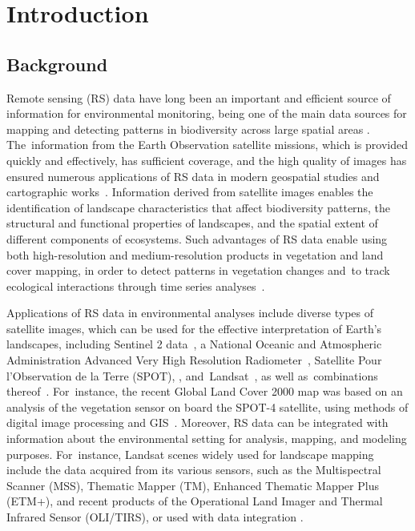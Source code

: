 \documentclass[coasts,article,accept,pdftex,oneauthor]{Definitions/mdpi}
\begin{document}
\section{Introduction}

\subsection{Background}
Remote sensing (RS) data {have} long been an important and efficient source of information {for} environmental monitoring, being one of the main data sources for mapping and detecting patterns {in} biodiversity across large spatial areas \cite{FAGAN2024432}. The~information from the Earth Observation satellite missions, which is provided quickly and {effectively}, %
has sufficient coverage{, }and {the} high quality of images {has} ensured numerous applications of RS data in modern geospatial studies and cartographic works~\cite{LOEB2023}. {Information derived from {satellite} images enables {the identification of} landscape characteristics that affect biodiversity {patterns}, the structural and functional properties of landscapes{, and the} spatial extent of different components of ecosystems. Such advantages of {RS} data enable {using} }both high-resolution and medium-resolution {products} in vegetation and land cover mapping{,} in order to detect patterns {in} vegetation changes{ }and~to track ecological interactions through time series analyses~\cite{6352393,info14040249,Lemenkova202324}. 

{Applications of RS data in environmental analyses include diverse} types of satellite images{,} {{which} can be used }for the effective interpretation of Earth's landscapes{,} {including} {Sentinel} 2 {data}~\cite{ZHAO2024169152,Lemenkova202021,CHOUDHARY20222443}, a National Oceanic and Atmospheric Administration Advanced Very High Resolution Radiometer~\cite{JI2017215,ZHAN2022112836}, Satellite Pour l'Observation de la Terre (SPOT{)}, \cite{FENSHOLT20091886}, {and}~Landsat~\cite{CHEN2023e19654,Lemenkova202323,LEMESIOS2024101153,SENAY2022113011,Lemenkova202321}, {as well as}~combinations thereof~\cite{XIE2023,RADELOFF2024113918}. For~instance, {the} recent Global Land Cover 2000 map was based on an analysis of the {vegetation} sensor on board the SPOT-4 satellite, using methods of digital image processing and GIS~\cite{GIRI2005123,WANG2023311}. {Moreover, RS data can be integrated with information about the environmental setting for analysis, mapping{,} and {modeling} purposes. For~instance, }Landsat scenes widely used for landscape mapping include the data{ }acquired from {its }various{ }sensors{,} such as {the} Multispectral Scanner (MSS), Thematic Mapper (TM), Enhanced Thematic Mapper Plus (ETM{+)}, and recent {products} of {the} Operational Land Imager and Thermal Infrared Sensor (OLI/TIRS), {or used {with} data integration }\cite{HE2018181,HUSSAIN2022103117,ESTOQUE2015205}.
\end{document}
